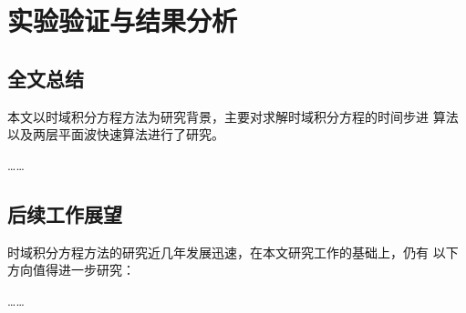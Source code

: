 
\chapter{实验验证与结果分析}

\section{全文总结}
本文以时域积分方程方法为研究背景，主要对求解时域积分方程的时间步进
算法以及两层平面波快速算法进行了研究。

……
\section{后续工作展望}
时域积分方程方法的研究近几年发展迅速，在本文研究工作的基础上，仍有
以下方向值得进一步研究：

……